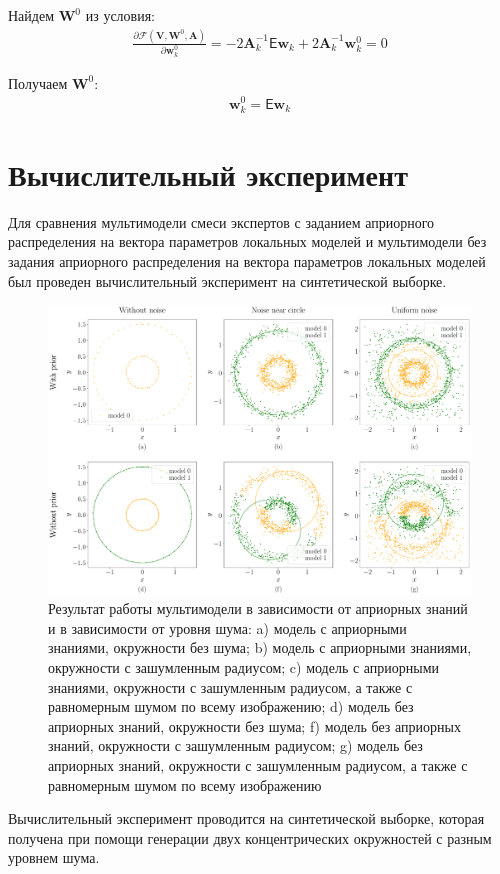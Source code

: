 \documentclass[12pt, twoside]{article}
\numberwithin{equation}{section}
\begin{document}
Найдем $\textbf{W}^{0}$ из условия:
\begin{equation}
\label{eq:st:lin:10}
\begin{aligned}
\frac{\partial \mathcal{F}\left(\textbf{V}, \textbf{W}^{0}, \textbf{A}\right)}{\partial \textbf{w}_{k}^{0}} = -2\textbf{A}_{k}^{-1}\mathsf{E}\textbf{w}_{k} + 2\textbf{A}_{k}^{-1}\textbf{w}_{k}^{0}=0
\end{aligned}
\end{equation}

Получаем $\textbf{W}^{0}$:
\begin{equation}
\label{eq:st:lin:11}
\begin{aligned}
\textbf{w}_{k}^{0} = \mathsf{E}\textbf{w}_{k}
\end{aligned}
\end{equation}

\section{Вычислительный эксперимент}
Для сравнения мультимодели смеси экспертов с заданием априорного распределения на вектора параметров локальных моделей и мультимодели без задания априорного распределения на вектора параметров локальных моделей был проведен вычислительный эксперимент на синтетической выборке.

\begin{figure}[h!t]\center
\includegraphics[width=1\textwidth]{results/experiment_synthetic}
\caption{Результат работы мультимодели в зависимости от априорных знаний и в зависимости от уровня шума: a) модель с априорными знаниями, окружности без шума; b) модель с априорными знаниями, окружности с зашумленным радиусом; c) модель с априорными знаниями, окружности с зашумленным радиусом, а также с равномерным шумом по всему изображению; d) модель без априорных знаний, окружности без шума; f) модель без априорных знаний, окружности с зашумленным радиусом; g) модель без априорных знаний, окружности с зашумленным радиусом, а также с равномерным шумом по всему изображению}
\label{experiment:1}
\end{figure}
Вычислительный эксперимент проводится на синтетической выборке, которая получена при помощи генерации двух концентрических окружностей с разным уровнем шума.
\end{document}
